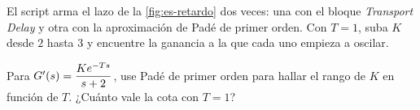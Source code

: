 \begin{modelo}
El script  arma el lazo de la \cref{fig:es-retardo} dos veces: una con el bloque \emph{Transport Delay} y otra con la aproximación de Padé de primer orden. Con $T=1$, suba $K$ desde $2$ hasta $3$ y encuentre la ganancia a la que cada uno empieza a oscilar.
\end{modelo}

\begin{pausa}
Para $G'(s)=\dfrac{Ke^{-Ts}}{s+2}$, use Padé de primer orden para hallar el rango de $K$ en función de $T$. ¿Cuánto vale la cota con $T=1$?
\end{pausa}
